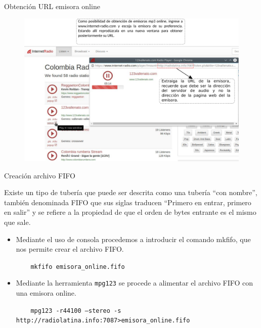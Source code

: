 \begin{frame}{Obtención URL emisora online}
    
\begin{figure}[H]
\centering
\vspace{-3mm}
\includegraphics[width=.9\textwidth]{parte3/lab13/pdf/lab13_2.pdf}
\end{figure}
    
\end{frame}

\begin{frame}{Creación archivo FIFO}

Existe un tipo de tubería que puede ser descrita como una tubería “con nombre”, también denominada FIFO que sus siglas traducen “Primero en entrar, primero en salir” y se refiere a la propiedad de que el orden de bytes entrante es el mismo que sale.

\begin{itemize}
    \item {Mediante el uso de consola procedemos a introducir el comando mkfifo, que nos permite crear el archivo FIFO.
    
    \begin{block}{}
    \texttt{
    \ \ \ mkfifo emisora\_online.fifo}
    \end{block}
    }
    \item {Mediante la herramienta \texttt{mpg123} se procede a alimentar el archivo FIFO con una emisora online.
    
    \begin{block}{}
    \texttt{
    \ \ \ mpg123 -r44100 --stereo -s http://radiolatina.info:7087>emisora\_online.fifo}
    \end{block}
    }
\end{itemize}
\end{frame}

